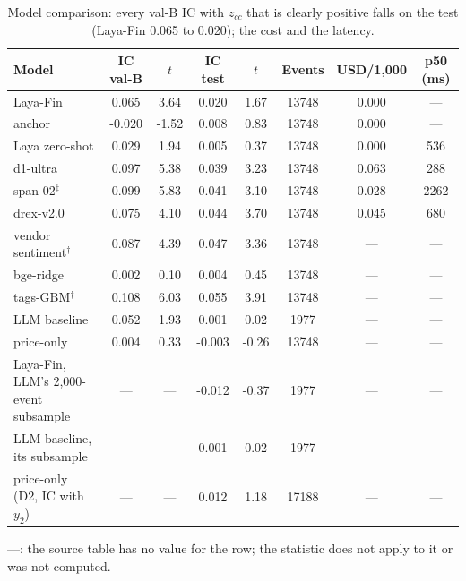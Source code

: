 \begin{table}[htbp]
\centering
\footnotesize
\begin{threeparttable}
\caption{Model comparison: every val-B IC with $z_{cc}$ that is clearly positive falls on the test (Laya-Fin 0.065 to 0.020); the cost and the latency.}\label{tab:a-model-comparison}
\begin{tabular}{@{}>{\raggedright\arraybackslash}p{1.75in}S[table-format=-1.3]S[table-format=-1.2]S[table-format=-1.3]S[table-format=-1.2]S[table-format=5.0]S[table-format=1.3]S[table-format=4.0]@{}}
\toprule
Model & {IC val-B} & {$t$} & {IC test} & {$t$} & {Events} & {USD/1,000} & {p50 (ms)} \\
\midrule
Laya-Fin & 0.065 & 3.64 & 0.020 & 1.67 & 13748 & 0.000 & {---} \\
anchor & -0.020 & -1.52 & 0.008 & 0.83 & 13748 & 0.000 & {---} \\
Laya zero-shot & 0.029 & 1.94 & 0.005 & 0.37 & 13748 & 0.000 & 536 \\
d1-ultra & 0.097 & 5.38 & 0.039 & 3.23 & 13748 & 0.063 & 288 \\
span-02$^{\ddagger}$ & 0.099 & 5.83 & 0.041 & 3.10 & 13748 & 0.028 & 2262 \\
drex-v2.0 & 0.075 & 4.10 & 0.044 & 3.70 & 13748 & 0.045 & 680 \\
vendor sentiment$^{\dagger}$ & 0.087 & 4.39 & 0.047 & 3.36 & 13748 & {---} & {---} \\
bge-ridge & 0.002 & 0.10 & 0.004 & 0.45 & 13748 & {---} & {---} \\
tags-GBM$^{\dagger}$ & 0.108 & 6.03 & 0.055 & 3.91 & 13748 & {---} & {---} \\
LLM baseline & 0.052 & 1.93 & 0.001 & 0.02 & 1977 & {---} & {---} \\
price-only & 0.004 & 0.33 & -0.003 & -0.26 & 13748 & {---} & {---} \\
Laya-Fin, LLM's 2,000-event subsample & {---} & {---} & -0.012 & -0.37 & 1977 & {---} & {---} \\
LLM baseline, its subsample & {---} & {---} & 0.001 & 0.02 & 1977 & {---} & {---} \\
price-only (D2, IC with $y_2$) & {---} & {---} & 0.012 & 1.18 & 17188 & {---} & {---} \\
\bottomrule
\end{tabular}
\begin{tablenotes}[flushleft]\footnotesize
\item ---: the source table has no value for the row; the statistic does not apply to it or was not computed.

\end{tablenotes}
\end{threeparttable}
\end{table}
